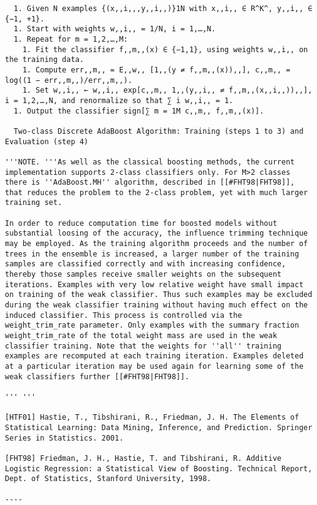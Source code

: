 \begin{verbatim}
  1. Given N examples {(x,,i,,,y,,i,,)}1N with x,,i,, ∈ R^K^, y,,i,, ∈ {−1, +1}.
  1. Start with weights w,,i,, = 1/N, i = 1,…,N.
  1. Repeat for m = 1,2,…,M:
    1. Fit the classifier f,,m,,(x) ∈ {−1,1}, using weights w,,i,, on the training data.
    1. Compute err,,m,, = E,,w,, [1,,(y ≠ f,,m,,(x)),,], c,,m,, = log((1 − err,,m,,)/err,,m,,).
    1. Set w,,i,, ← w,,i,, exp[c,,m,, 1,,(y,,i,, ≠ f,,m,,(x,,i,,)),,], i = 1,2,…,N, and renormalize so that ∑ i w,,i,, = 1.
  1. Output the classifier sign[∑ m = 1M c,,m,, f,,m,,(x)].

  Two-class Discrete AdaBoost Algorithm: Training (steps 1 to 3) and Evaluation (step 4)

'''NOTE. '''As well as the classical boosting methods, the current implementation supports 2-class classifiers only. For M>2 classes there is ''AdaBoost.MH'' algorithm, described in [[#FHT98|FHT98]], that reduces the problem to the 2-class problem, yet with much larger training set.

In order to reduce computation time for boosted models without substantial loosing of the accuracy, the influence trimming technique may be employed. As the training algorithm proceeds and the number of trees in the ensemble is increased, a larger number of the training samples are classified correctly and with increasing confidence, thereby those samples receive smaller weights on the subsequent iterations. Examples with very low relative weight have small impact on training of the weak classifier. Thus such examples may be excluded during the weak classifier training without having much effect on the induced classifier. This process is controlled via the weight_trim_rate parameter. Only examples with the summary fraction weight_trim_rate of the total weight mass are used in the weak classifier training. Note that the weights for ''all'' training examples are recomputed at each training iteration. Examples deleted at a particular iteration may be used again for learning some of the weak classifiers further [[#FHT98|FHT98]].

''' '''

[HTF01] Hastie, T., Tibshirani, R., Friedman, J. H. The Elements of Statistical Learning: Data Mining, Inference, and Prediction. Springer Series in Statistics. 2001.

[FHT98] Friedman, J. H., Hastie, T. and Tibshirani, R. Additive Logistic Regression: a Statistical View of Boosting. Technical Report, Dept. of Statistics, Stanford University, 1998.

----


\end{verbatim}
